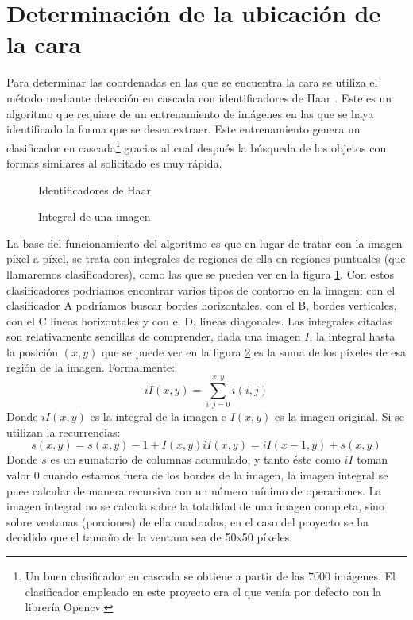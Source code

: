 \newpage

\section{Determinación de la ubicación de la cara}
Para determinar las coordenadas en las que se encuentra la cara se utiliza el método mediante detección en cascada con identificadores de Haar \cite{ViolaJones}. Este es un algoritmo que requiere de un entrenamiento de imágenes en las que se haya identificado la forma que se desea extraer. Este entrenamiento genera un clasificador en cascada\footnote{Un buen clasificador en cascada se obtiene a partir de las 7000 imágenes. El clasificador empleado en este proyecto era el que venía por defecto con la librería Opencv.} gracias al cual después la búsqueda de los objetos con formas similares al solicitado es muy rápida. 
\begin{figure}[!hbt]
	\centering
	
	\caption{Identificadores de Haar}
	\label{fig:Haar_identifiers}
\end{figure}

\begin{figure}[!hbt]
	\centering
	
	\caption{Integral de una imagen}
	\label{fig:image_integral}
\end{figure}

La base del funcionamiento del algoritmo es que en lugar de tratar con la imagen píxel a píxel, se trata con integrales de regiones de ella en regiones puntuales (que llamaremos clasificadores), como las que se pueden ver en la figura \ref{fig:Haar_identifiers}. Con estos clasificadores podríamos encontrar varios tipos de contorno en la imagen: con el clasificador A podríamos buscar bordes horizontales, con el B, bordes verticales, con el C líneas horizontales y con el D, líneas diagonales. Las integrales citadas son relativamente sencillas de comprender, dada una imagen $I$, la integral hasta la posición $(x,y)$ que se puede ver en la figura \ref{fig:image_integral} es la suma de los píxeles de esa región de la imagen. Formalmente:
\[ 
	iI(x,y) = \sum_{i,j=0}^{x,y}i(i,j)
\]
Donde $iI(x,y)$ es la integral de la imagen e $I(x,y)$ es la imagen original. Si se utilizan la recurrencias:
\[ 
	s(x,y)=s(x,y)-1 + I(x,y)
	iI(x,y)=iI(x-1,y)+s(x,y)
\]
Donde $s$ es un sumatorio de columnas acumulado, y tanto éste como $iI$ toman valor 0 cuando estamos fuera de los bordes de la imagen, la imagen integral se puee calcular de manera recursiva con un número mínimo de operaciones. La imagen integral no se calcula sobre la totalidad de una imagen completa, sino sobre ventanas (porciones) de ella cuadradas, en el caso del proyecto se ha decidido que el tamaño de la ventana sea de 50x50 píxeles. 

